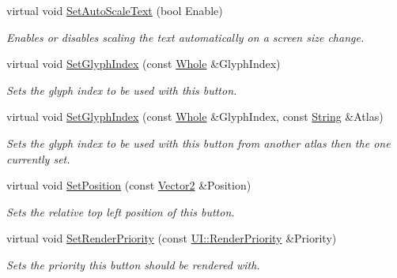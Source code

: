 \begin{DoxyCompactItemize}
virtual void \hyperlink{classMezzanine_1_1UI_1_1TextButton_a80e8ce555469e1f5f5c2fd6134571a40}{SetAutoScaleText} (bool Enable)
\begin{DoxyCompactList}\small\item\em Enables or disables scaling the text automatically on a screen size change. \item\end{DoxyCompactList}\item 
virtual void \hyperlink{classMezzanine_1_1UI_1_1TextButton_ab81057cd97a96390ae23c12cc729a07b}{SetGlyphIndex} (const \hyperlink{namespaceMezzanine_adcbb6ce6d1eb4379d109e51171e2e493}{Whole} \&GlyphIndex)
\begin{DoxyCompactList}\small\item\em Sets the glyph index to be used with this button. \item\end{DoxyCompactList}\item 
virtual void \hyperlink{classMezzanine_1_1UI_1_1TextButton_a472deffab04ac63c4938cc928d24f11e}{SetGlyphIndex} (const \hyperlink{namespaceMezzanine_adcbb6ce6d1eb4379d109e51171e2e493}{Whole} \&GlyphIndex, const \hyperlink{namespaceMezzanine_acf9fcc130e6ebf08e3d8491aebcf1c86}{String} \&Atlas)
\begin{DoxyCompactList}\small\item\em Sets the glyph index to be used with this button from another atlas then the one currently set. \item\end{DoxyCompactList}\item 
virtual void \hyperlink{classMezzanine_1_1UI_1_1TextButton_af91cf1040a11180eba704e054def6a7a}{SetPosition} (const \hyperlink{classMezzanine_1_1Vector2}{Vector2} \&Position)
\begin{DoxyCompactList}\small\item\em Sets the relative top left position of this button. \item\end{DoxyCompactList}\item 
virtual void \hyperlink{classMezzanine_1_1UI_1_1TextButton_a546446b4b6394fb7e58bfa64d554ada3}{SetRenderPriority} (const \hyperlink{namespaceMezzanine_1_1UI_ac4c753eb6b5d66350a243acc9ce54130}{UI::RenderPriority} \&Priority)
\begin{DoxyCompactList}\small\item\em Sets the priority this button should be rendered with. \item\end{DoxyCompactList}\item 

\end{DoxyCompactItemize}
